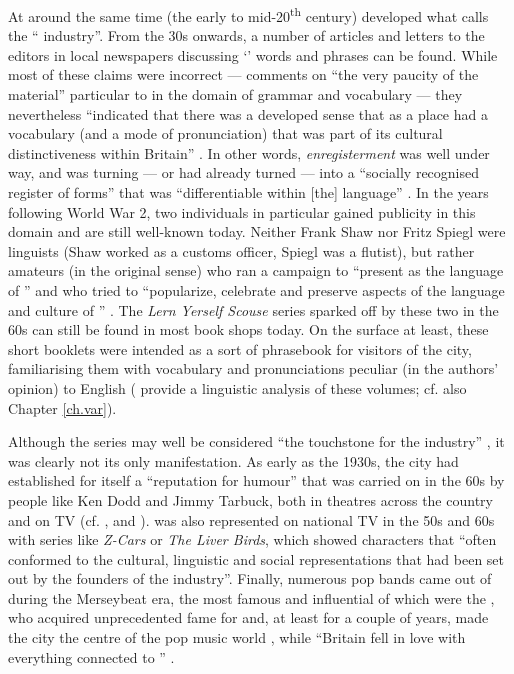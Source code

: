 At around the same time (the early to mid-20\textsuperscript{th} century) developed what \citet[40]{crowley2012} calls the `` industry''.
From the 30s onwards, a number of articles and letters to the editors in local newspapers discussing `' words and phrases can be found.
While most of these claims were incorrect --- \citet[48]{knowles1973} comments on ``the very paucity of the material'' particular to  in the domain of grammar and vocabulary --- they nevertheless ``indicated that there was a developed sense that  as a place had a vocabulary (and a mode of pronunciation) that was part of its cultural distinctiveness within Britain'' \citeyearpar[42]{crowley2012}.
In other words, \emph{enregisterment} was well under way, and  was turning --- or had already turned --- into a ``socially recognised register of forms'' that was ``differentiable within [the] language'' \parencite[231]{agha2003}.
In the years following World War 2, two individuals in particular gained publicity in this domain and are still well-known today.
Neither Frank Shaw nor Fritz Spiegl were linguists (Shaw worked as a customs officer, Spiegl was a flutist), but rather amateurs (in the original sense) who ran a campaign to ``present  as the language of '' and who tried to ``popularize, celebrate and preserve aspects of the language and culture of '' \citep[64--65]{crowley2012}.
The \emph{Lern Yerself Scouse} series sparked off by these two in the 60s can still be found in most  book shops today.
On the surface at least, these short booklets were intended as a sort of phrasebook for visitors of the city, familiarising them with vocabulary and pronunciations peculiar (in the authors' opinion) to  English (\citet{honeybonewatson2013} provide a linguistic analysis of these volumes; cf. also Chapter \ref{ch.var}).

Although the series may well be considered ``the touchstone for the  industry'' \citep[79]{crowley2012}, it was clearly not its only manifestation.
As early as the 1930s, the city had established for itself a ``reputation for humour'' that was carried on in the 60s by people like Ken Dodd and Jimmy Tarbuck, both in theatres across the country and on TV (cf. \citealt[423]{murden2006}, and \citealp[49]{belchem2006a}).
 was also represented on national TV in the 50s and 60s with series like \emph{Z-Cars} or \emph{The Liver Birds}, which showed characters that ``often conformed to the cultural, linguistic and social representations that had been set out by the founders of the  industry''.
Finally, numerous pop bands came out of  during the Merseybeat era, the most famous and influential of which were the , who acquired unprecedented fame for  and, at least for a couple of years, made the city the centre of the pop music world \citep[cf.][75]{crowley2012}, while ``Britain fell in love with everything connected to '' \citep[423]{murden2006}.

